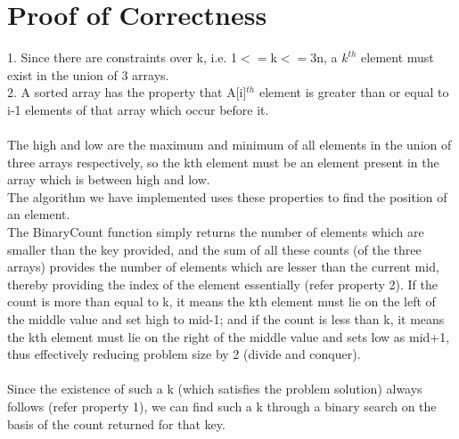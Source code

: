 \documentclass{article}
\begin{document}
\section{Proof of Correctness}
1. Since there are constraints over k, i.e. 1$<=$k$<=$3n, a $k^{th}$ element must exist in the union of 3 arrays.\\
2. A sorted array has the property that A[i]$^{th}$ element is greater than or equal to i-1 elements of that array which occur before it.\\
\\The high and low are the maximum and minimum of all elements in the union of three arrays respectively, so the kth element must be an element present in the array which is between high and low.\\
The algorithm we have implemented uses these properties to find the position of an element.\\
The BinaryCount function simply returns the number of elements which are smaller than the key provided, and the sum of all these counts (of the three arrays) provides the number of elements which are lesser than the current mid, thereby providing the index of the element essentially (refer property 2). If the count is more than equal to k, it means the kth element must lie on the left of the middle value and set high to mid-1; and if the count is less than k, it means the kth element must lie on the right of the middle value and sets low as mid+1, thus effectively reducing problem size by 2 (divide and conquer).\\
\\Since the existence of such a k (which satisfies the problem solution) always follows (refer property 1), we can find such a k through a binary search on the basis of the count returned for that key.
\end{document}
